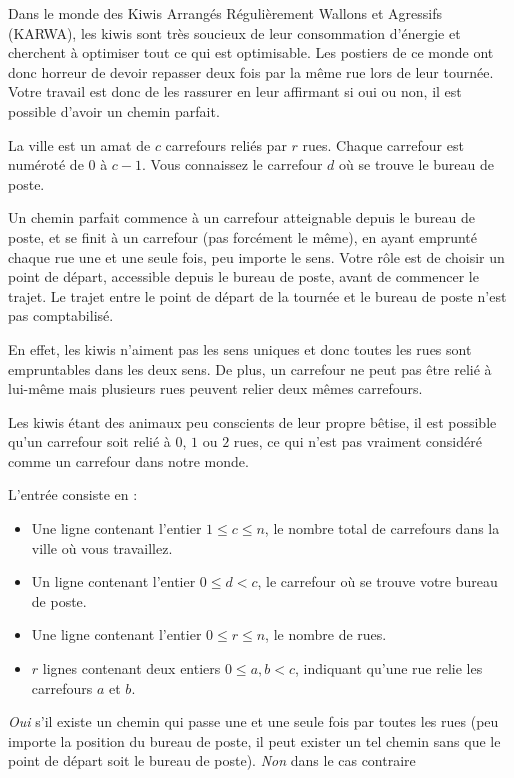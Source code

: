 

Dans le monde des Kiwis Arrangés Régulièrement Wallons et Agressifs (KARWA), les kiwis sont très soucieux de leur consommation d'énergie et cherchent à optimiser tout ce qui est optimisable. Les postiers de ce monde ont donc horreur de devoir repasser deux fois par la même rue lors de leur tournée. Votre travail est donc de les rassurer en leur affirmant si oui ou non, il est possible d'avoir un chemin parfait.

La ville est un amat de $c$ carrefours reliés par $r$ rues. Chaque carrefour est numéroté de $0$ à $c-1$. Vous connaissez le carrefour $d$ où se trouve le bureau de poste.

Un chemin parfait commence à un carrefour atteignable depuis le bureau de poste, et se finit à un carrefour (pas forcément le même), en ayant emprunté chaque rue une et une seule fois, peu importe le sens. Votre rôle est de choisir un point de départ, accessible depuis le bureau de poste, avant de commencer le trajet. Le trajet entre le point de départ de la tournée et le bureau de poste n'est pas comptabilisé.

En effet, les kiwis n'aiment pas les sens uniques et donc toutes les rues sont empruntables dans les deux sens. De plus, un carrefour ne peut pas être relié à lui-même mais plusieurs rues peuvent relier deux mêmes carrefours.

Les kiwis étant des animaux peu conscients de leur propre bêtise, il est possible qu'un carrefour soit relié à $0$, $1$ ou $2$ rues, ce qui n'est pas vraiment considéré comme un carrefour dans notre monde.

\begin{Input}
    L'entrée consiste en :
    \begin{itemize}
        \item Une ligne contenant l'entier $1 \leq c \leq n$, le nombre total de carrefours dans la ville où vous travaillez.
        \item Un ligne contenant l'entier $0\leq d < c$, le carrefour où se trouve votre bureau de poste.
        \item Une ligne contenant l'entier $0 \leq r \leq n$, le nombre de rues.
        \item $r$ lignes contenant deux entiers $0\leq a,b < c$, indiquant qu'une rue relie les carrefours $a$ et $b$.
    \end{itemize}
\end{Input}

\begin{Output}
    \emph{Oui} s'il existe un chemin qui passe une et une seule fois par toutes les rues (peu importe la position du bureau de poste, il peut exister un tel chemin sans que le point de départ soit le bureau de poste). \emph{Non} dans le cas contraire
\end{Output}
